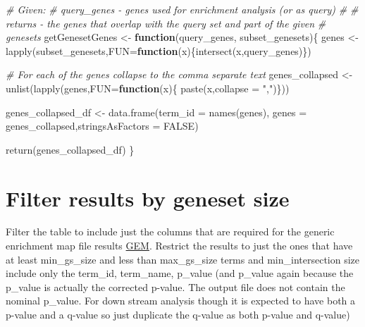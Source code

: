 \documentclass[
]{book}
\newenvironment{Shaded}{\begin{snugshade}}{\end{snugshade}}
\newcommand{\AttributeTok}[1]{\textcolor[rgb]{0.77,0.63,0.00}{#1}}
\newcommand{\CommentTok}[1]{\textcolor[rgb]{0.56,0.35,0.01}{\textit{#1}}}
\newcommand{\ConstantTok}[1]{\textcolor[rgb]{0.00,0.00,0.00}{#1}}
\newcommand{\ControlFlowTok}[1]{\textcolor[rgb]{0.13,0.29,0.53}{\textbf{#1}}}
\newcommand{\FunctionTok}[1]{\textcolor[rgb]{0.00,0.00,0.00}{#1}}
\newcommand{\NormalTok}[1]{#1}
\newcommand{\OtherTok}[1]{\textcolor[rgb]{0.56,0.35,0.01}{#1}}
\newcommand{\StringTok}[1]{\textcolor[rgb]{0.31,0.60,0.02}{#1}}
\begin{document}
\begin{Shaded}
\begin{Highlighting}[]
\CommentTok{\# Given:}
\CommentTok{\# query\_genes {-} genes used for enrichment analysis (or as query)}
\CommentTok{\#}
\CommentTok{\# returns {-} the genes that overlap with the query set and part of the given}
\CommentTok{\#           genesets}
\NormalTok{getGenesetGenes }\OtherTok{\textless{}{-}} \ControlFlowTok{function}\NormalTok{(query\_genes, subset\_genesets)\{}
\NormalTok{  genes }\OtherTok{\textless{}{-}} \FunctionTok{lapply}\NormalTok{(subset\_genesets,}\AttributeTok{FUN=}\ControlFlowTok{function}\NormalTok{(x)\{}\FunctionTok{intersect}\NormalTok{(x,query\_genes)\})}
  
  \CommentTok{\# For each of the genes collapse to the comma separate text}
\NormalTok{  genes\_collapsed }\OtherTok{\textless{}{-}} \FunctionTok{unlist}\NormalTok{(}\FunctionTok{lapply}\NormalTok{(genes,}\AttributeTok{FUN=}\ControlFlowTok{function}\NormalTok{(x)\{}
                                                \FunctionTok{paste}\NormalTok{(x,}\AttributeTok{collapse =} \StringTok{","}\NormalTok{)\}))}
  
\NormalTok{  genes\_collapsed\_df }\OtherTok{\textless{}{-}} \FunctionTok{data.frame}\NormalTok{(}\AttributeTok{term\_id =} \FunctionTok{names}\NormalTok{(genes), }
                            \AttributeTok{genes =}\NormalTok{ genes\_collapsed,}\AttributeTok{stringsAsFactors =} \ConstantTok{FALSE}\NormalTok{)}
  
  \FunctionTok{return}\NormalTok{(genes\_collapsed\_df)}
\NormalTok{\}}
\end{Highlighting}
\end{Shaded}

\hypertarget{filter-results-by-geneset-size}{%
\section{Filter results by geneset size}\label{filter-results-by-geneset-size}}

Filter the table to include just the columns that are required for the generic enrichment map file results \href{https://enrichmentmap.readthedocs.io/en/latest/FileFormats.html\#generic-results-files}{GEM}. Restrict the results to just the ones that have at least min\_gs\_size and less than max\_gs\_size terms and min\_intersection size include only the term\_id, term\_name, p\_value (and p\_value again because the p\_value is actually the corrected p-value. The output file does not contain the nominal p\_value. For down stream analysis though it is expected to have both a p-value and a q-value so just duplicate the q-value as both p-value and q-value)
\end{document}
